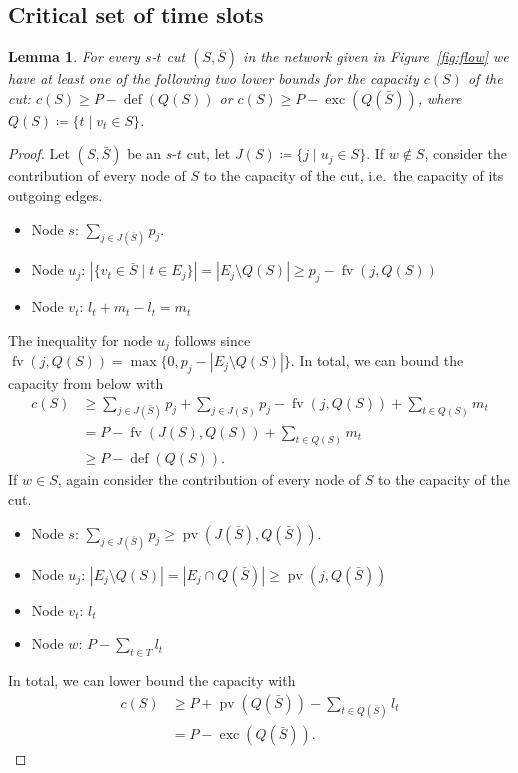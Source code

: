 \documentclass[a4paper]{article}
\DeclareMathOperator{\fv}{fv}
\DeclareMathOperator{\pv}{pv}
\DeclareMathOperator{\opdef}{def}
\DeclareMathOperator{\exc}{exc}
\newtheorem{lemma}[theorem]{Lemma}
\begin{document}
\subsection{Critical set of time slots}
\begin{lemma}\label{lemma:cut}
  For every $s$-$t$ cut $(S, \bar S)$ in the network given in Figure~\ref{fig:flow} we have at least one of the following two lower bounds for the capacity $c(S)$ of the cut:
  $c(S) \geq P - \opdef(Q(S))$ or $c(S) \geq P - \exc(Q(\bar S))$, where $Q(S) \coloneqq \{ t \mid v_t \in S \}$.
\end{lemma}
\begin{proof}
  Let $(S, \bar S)$ be an $s$-$t$ cut, let $J(S) \coloneqq \{j \mid u_j \in S\}$.
  If $w \notin S$, consider the contribution of every node of $S$ to the capacity of the cut, i.e.\ the capacity of its outgoing edges.
  \begin{itemize}
    \item Node $s$: $\sum_{j \in J(\bar S)} p_j$.
    \item Node $u_j$: $|\{v_t \in \bar S \mid t \in E_j\}| = | E_j \setminus Q(S) | \geq p_j - \fv(j, Q(S))$
    \item Node $v_t$: $l_t + m_t - l_t = m_t$
  \end{itemize}
  The inequality for node $u_j$ follows since $\fv(j, Q(S)) = \max \{0, p_j - |E_j \setminus Q(S)| \}$.
  In total, we can bound the capacity from below with
  \begin{align}
    c(S) &\geq \sum_{j \in J(\bar S)} p_j + \sum_{j \in J(S)} p_j - \fv(j, Q(S)) + \sum_{t \in Q(S)} m_t
    \\ &= P - \fv(J(S), Q(S)) + \sum_{t \in Q(S)} m_t
    \\ &\geq P - \opdef(Q(S))\text{.}
  \end{align}
  If $w \in S$, again consider the contribution of every node of $S$ to the capacity of the cut.
  \begin{itemize}
    \item Node $s$: $\sum_{j \in J(\bar S)} p_j \geq \pv(J(\bar S), Q(\bar S))$.
    \item Node $u_j$: $| E_j \setminus Q(S) |
      = | E_j \cap Q(\bar S)| \geq \pv(j, Q(\bar S))$
    \item Node $v_t$: $l_t$
    \item Node $w$: $P - \sum_{t \in T} l_t$
  \end{itemize}
  In total, we can lower bound the capacity with
  \begin{align}
    c(S) &\geq P + \pv(Q(\bar S))
    - \sum_{t \in Q(\bar S)} l_t
    \\ &= P - \exc(Q(\bar S)) \text{.}
  \end{align}

\end{proof}
\end{document}

